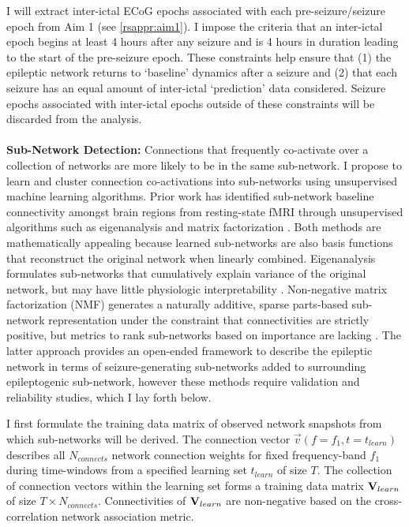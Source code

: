 I will extract inter-ictal ECoG epochs associated with each pre-seizure/seizure epoch from Aim 1 (see \ref{rsappr:aim1}). I impose the criteria that an inter-ictal epoch begins at least 4 hours after any seizure and is 4 hours in duration leading to the start of the pre-seizure epoch. These constraints help ensure that (1) the epileptic network returns to `baseline' dynamics after a seizure and (2) that each seizure has an equal amount of inter-ictal `prediction' data considered. Seizure epochs associated with inter-ictal epochs outside of these constraints will be discarded from the analysis.
~\\
~\\
\textbf{Sub-Network Detection:}
Connections that frequently co-activate over a collection of networks are more likely to be in the same sub-network. I propose to learn and cluster connection co-activations into sub-networks using unsupervised machine learning algorithms. Prior work has identified sub-network baseline connectivity amongst brain regions from resting-state fMRI through unsupervised algorithms such as eigenanalysis \cite{leonardi2013principal} and matrix factorization \cite{eavani2013identifying,eavani2013unsupervised}. Both methods are mathematically appealing because learned sub-networks are also basis functions that reconstruct the original network when linearly combined. Eigenanalysis formulates sub-networks that cumulatively explain variance of the original network, but may have little physiologic interpretability \cite{ghanbari2013connectivity}. Non-negative matrix factorization (NMF) generates a naturally additive, sparse parts-based sub-network representation under the constraint that connectivities are strictly positive, but metrics to rank sub-networks based on importance are lacking \cite{ghanbari2013connectivity}. The latter approach provides an open-ended framework to describe the epileptic network in terms of seizure-generating sub-networks added to surrounding epileptogenic sub-network, however these methods require validation and reliability studies, which I lay forth below.

I first formulate the training data matrix of observed network snapshots from which sub-networks will be derived. The connection vector $\vec{v}(f=f_1,t=t_{learn})$ describes all $N_{connects}$ network connection weights for fixed frequency-band $f_1$ during time-windows from a specified learning set $t_{learn}$ of size $T$. The collection of connection vectors within the learning set forms a training data matrix $\mathbf{\displaystyle V}_{learn}$ of size $T \times N_{connects}$. Connectivities of $\mathbf{\displaystyle V}_{learn}$ are non-negative based on the cross-correlation network association metric.

